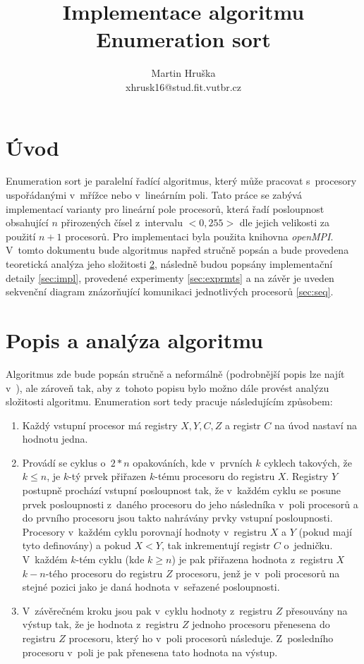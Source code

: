 \documentclass[a4paper, 12pt]{article}
\title{Implementace algoritmu Enumeration sort}
\author{Martin Hruška\\xhrusk16@stud.fit.vutbr.cz}
\date{}
\begin{document}
\maketitle

\section{Úvod}
\label{sec:intro}
Enumeration sort je paralelní řadící algoritmus, který může pracovat s~procesory uspořádanými v~mřížce nebo v~lineárním poli.
Tato práce se zabývá implementací varianty pro lineární pole procesorů, která řadí
posloupnost obsahující $n$ přirozených čísel z~intervalu $<0,255>$ dle jejich velikosti za použití $n+1$ procesorů.
Pro implementaci byla použita knihovna \emph{openMPI}.
V~tomto dokumentu bude algoritmus napřed
stručně popsán a bude provedena teoretická analýza jeho složitosti \ref{sec:analysis},
následně budou popsány implementační detaily \ref{sec:impl},
provedené experimenty \ref{sec:exprmts}
a na závěr je uveden sekvenční diagram znázorňující komunikaci jednotlivých procesorů \ref{sec:seq}.

\section{Popis a analýza algoritmu}
\label{sec:analysis}
Algoritmus zde bude popsán stručně a neformálně (podrobnější popis lze najít v~\cite{prl:pred}),
ale zároveň tak, aby z~tohoto popisu bylo možno dále provést analýzu složitosti algoritmu.
Enumeration sort tedy pracuje následujícím způsobem:
\begin{enumerate}
\item Každý vstupní procesor má registry $X, Y, C, Z$ a registr $C$ na úvod nastaví
na hodnotu jedna.
\item Provádí se cyklus o~$2*n$ opakováních, kde v~prvních $k$ cyklech takových, že $k\leq n$,
je $k$-tý prvek přiřazen $k$-tému procesoru do registru $X$.
Registry $Y$ postupně prochází vstupní posloupnost tak, že v~každém cyklu se posune prvek posloupnosti z~daného procesoru
do jeho následníka v~poli procesorů a do prvního procesoru jsou takto nahrávány prvky vstupní posloupnosti.
Procesory v~každém cyklu porovnají hodnoty v~registru $X$ a $Y$ (pokud mají tyto definovány)
a pokud $X < Y$, tak inkrementují registr $C$ o~jedničku.
V~každém $k$-tém cyklu (kde $k \geq n$) je pak přiřazena hodnota z~registru $X$ $k-n$-tého procesoru do registru $Z$ procesoru,
jenž je v~poli procesorů na stejné pozici jako je daná hodnota v~seřazené posloupnosti.
\item V~závěrečném kroku jsou pak v~cyklu hodnoty z~registru $Z$ přesouvány na výstup tak, že je hodnota
z~registru $Z$ jednoho procesoru přenesena do registru $Z$ procesoru, který ho v~poli procesorů následuje.
Z~posledního procesoru v~poli je pak přenesena tato hodnota na výstup.
\end{enumerate}
\end{document}
